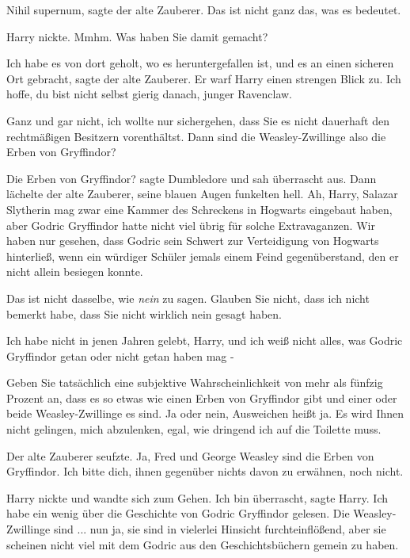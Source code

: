 \glqq Nihil supernum\grqq{}, sagte der alte Zauberer. \glqq Das ist nicht ganz
das, was es bedeutet.\grqq{}

Harry nickte. \glqq Mmhm. Was haben Sie damit gemacht?\grqq{}

\glqq Ich habe es von dort geholt, wo es heruntergefallen ist, und es an einen
sicheren Ort gebracht\grqq{}, sagte der alte Zauberer. Er warf Harry einen
strengen Blick zu. \glqq Ich hoffe, du bist nicht selbst gierig danach, junger
Ravenclaw.\grqq{}

\glqq Ganz und gar nicht, ich wollte nur sichergehen, dass Sie es nicht
dauerhaft den rechtmäßigen Besitzern vorenthältst. Dann sind die
Weasley-Zwillinge also die Erben von Gryffindor?\grqq{}

\glqq Die Erben von Gryffindor?\grqq{} sagte Dumbledore und sah überrascht aus.
Dann lächelte der alte Zauberer, seine blauen Augen funkelten hell. \glqq Ah,
Harry, Salazar Slytherin mag zwar eine Kammer des Schreckens in Hogwarts
eingebaut haben, aber Godric Gryffindor hatte nicht viel übrig für solche
Extravaganzen. Wir haben nur gesehen, dass Godric sein Schwert zur Verteidigung
von Hogwarts hinterließ, wenn ein würdiger Schüler jemals einem Feind
gegenüberstand, den er nicht allein besiegen konnte.\grqq{}

\glqq Das ist nicht dasselbe, wie \emph{nein} zu sagen. Glauben Sie nicht, dass
ich nicht bemerkt habe, dass Sie nicht wirklich nein gesagt haben.\grqq{}

\glqq Ich habe nicht in jenen Jahren gelebt, Harry, und ich weiß nicht alles,
was Godric Gryffindor getan oder nicht getan haben mag -\grqq{}

\glqq Geben Sie tatsächlich eine subjektive Wahrscheinlichkeit von mehr als
fünfzig Prozent an, dass es so etwas wie einen Erben von Gryffindor gibt und
einer oder beide Weasley-Zwillinge es sind. Ja oder nein, Ausweichen heißt ja.
Es wird Ihnen nicht gelingen, mich abzulenken, egal, wie dringend ich auf die
Toilette muss.\grqq{}

Der alte Zauberer seufzte. \glqq Ja, Fred und George Weasley sind die Erben von
Gryffindor. Ich bitte dich, ihnen gegenüber nichts davon zu erwähnen, noch
nicht.\grqq{}

Harry nickte und wandte sich zum Gehen. \glqq Ich bin überrascht\grqq{}, sagte
Harry. \glqq Ich habe ein wenig über die Geschichte von Godric Gryffindor
gelesen. Die Weasley-Zwillinge sind ... nun ja, sie sind in vielerlei Hinsicht
furchteinflößend, aber sie scheinen nicht viel mit dem Godric aus den
Geschichtsbüchern gemein zu haben.\grqq{}

